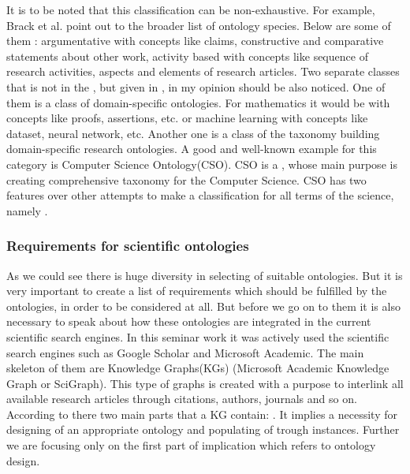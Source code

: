 		It is to be noted that this classification can be non-exhaustive. For example, Brack et al. point out to the broader list of ontology species. Below are some of them\cite{Bra20} : argumentative with concepts like claims, constructive and comparative statements about other work, activity based with concepts like sequence of research activities, aspects and elements of research articles. Two separate classes that is not in the \cite{Cor14}, but given in \cite{Bra20}, in my opinion should be also noticed. One of them is a class of domain-specific ontologies. For mathematics it would be with concepts like proofs, assertions, etc. or machine learning with concepts like dataset, neural network, etc. Another one is a class of the taxonomy building domain-specific research ontologies. A good and well-known example for this category is Computer Science Ontology(CSO). CSO is a \frqq\cite[p.1]{CSO19}, whose main purpose is creating comprehensive taxonomy for the Computer Science. CSO has two features over other attempts to make a classification for all terms of the science, namely \frqq\cite[p.1]{CSO19}.  
		
		\subsubsection{Requirements for scientific ontologies}
		As we could see there is huge diversity in selecting of suitable ontologies. But it is very important to create a list of requirements which should be fulfilled by the ontologies, in order to be considered at all. But before we go on to them it is also necessary to speak about how these ontologies are integrated in the current scientific search engines.
		In this seminar work it was actively used the scientific search engines such as Google Scholar and Microsoft Academic. The main skeleton of them are Knowledge Graphs(KGs) (Microsoft Academic Knowledge Graph or SciGraph). This type of graphs is created with a purpose to interlink all available research articles through citations, authors, journals and so on. According to \cite{Bra20} there two main parts that a KG contain: \frqq\cite[p. 1, footnote 3]{Bra20}. It implies a necessity for designing of an appropriate ontology and populating of trough instances. Further we are focusing only on the first part of implication which refers to ontology design.
		
